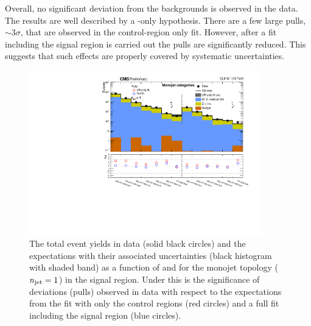Overall, no significant deviation from the \SM backgrounds is observed
in the data. The results are well described by a \SM-only hypothesis.
There are a few large pulls, $\sim 3\sigma$, that are observed in the
control-region only fit. However, after a fit including the signal
region is carried out the pulls are significantly reduced. This
suggests that such effects are properly covered by systematic
uncertainties.

\begin{figure}[!htb]
  \begin{center}
    \includegraphics[width=0.9\textwidth]{figs/analysis/results/summaryPlot_Monojet_prefit_overlay_fit_b}
    \caption{The total event yields in data (solid black circles)
      and the \SM expectations with their associated uncertainties (black
      histogram with shaded band) as a function of
      \nb and \HT for the monojet topology ($n_{\text{jet}} = 1$) in the
      signal region. Under this is the significance of deviations
      (pulls) observed in data with respect to the \SM expectations
      from the fit with only the control regions (red circles) and a
      full fit including the signal region (blue circles).}
    \label{fig:mono}
  \end{center}
\end{figure}

